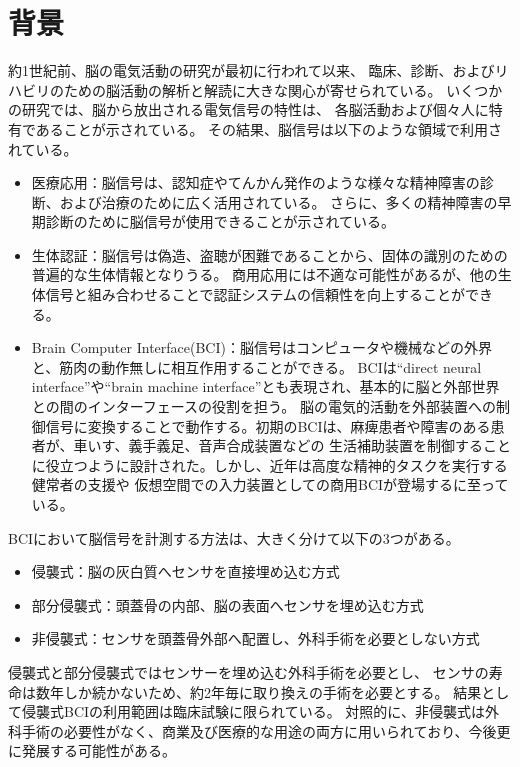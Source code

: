 \section{\mc 背景}

約1世紀前、脳の電気活動の研究が最初に行われて以来、
臨床、診断、およびリハビリのための脳活動の解析と解読に大きな関心が寄せられている。
いくつかの研究では、脳から放出される電気信号の特性は、
各脳活動および個々人に特有であることが示されている。
その結果、脳信号は以下のような領域で利用されている。
\begin{itemize}
    \item 医療応用：脳信号は、認知症やてんかん発作のような様々な精神障害の診断、および治療のために広く活用されている。
    さらに、多くの精神障害の早期診断のために脳信号が使用できることが示されている。
    \item 生体認証：脳信号は偽造、盗聴が困難であることから、固体の識別のための普遍的な生体情報となりうる。
    商用応用には不適な可能性があるが、他の生体信号と組み合わせることで認証システムの信頼性を向上することができる。
    \item Brain Computer Interface(BCI)：脳信号はコンピュータや機械などの外界と、筋肉の動作無しに相互作用することができる。
    BCIは``direct neural interface''や``brain machine interface''とも表現され、基本的に脳と外部世界との間のインターフェースの役割を担う。
    脳の電気的活動を外部装置への制御信号に変換することで動作する。初期のBCIは、麻痺患者や障害のある患者が、車いす、義手義足、音声合成装置などの
    生活補助装置を制御することに役立つように設計された。しかし、近年は高度な精神的タスクを実行する健常者の支援や
    仮想空間での入力装置としての商用BCIが登場するに至っている。
\end{itemize}
BCIにおいて脳信号を計測する方法は、大きく分けて以下の3つがある。
\begin{itemize}
    \item 侵襲式：脳の灰白質へセンサを直接埋め込む方式
    \item 部分侵襲式：頭蓋骨の内部、脳の表面へセンサを埋め込む方式
    \item 非侵襲式：センサを頭蓋骨外部へ配置し、外科手術を必要としない方式
\end{itemize}
侵襲式と部分侵襲式ではセンサーを埋め込む外科手術を必要とし、
センサの寿命は数年しか続かないため、約2年毎に取り換えの手術を必要とする。
結果として侵襲式BCIの利用範囲は臨床試験に限られている。
対照的に、非侵襲式は外科手術の必要性がなく、商業及び医療的な用途の両方に用いられており、今後更に発展する可能性がある。

